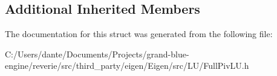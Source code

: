 \subsection*{Additional Inherited Members}


The documentation for this struct was generated from the following file\+:\begin{DoxyCompactItemize}
\item 
C\+:/\+Users/dante/\+Documents/\+Projects/grand-\/blue-\/engine/reverie/src/third\+\_\+party/eigen/\+Eigen/src/\+L\+U/Full\+Piv\+L\+U.\+h\end{DoxyCompactItemize}
